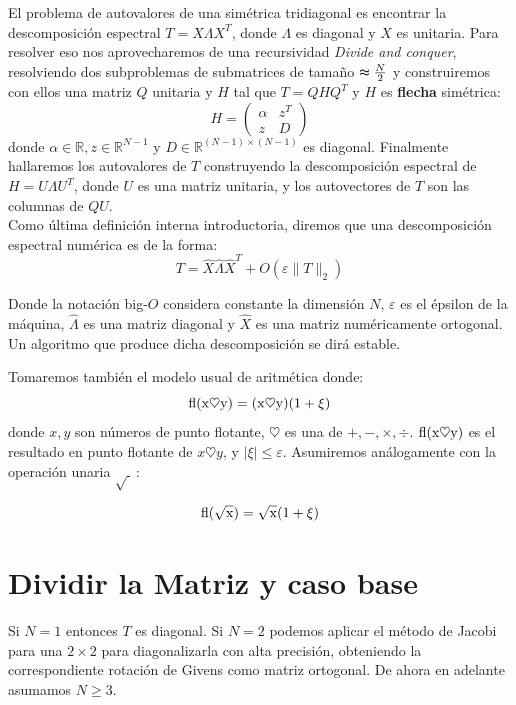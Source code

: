 \documentclass[11pt,a4paper]{article}
\newcommand{\R}{\mathbb{R}}
\begin{document}
El problema de autovalores de una simétrica tridiagonal es encontrar la descomposición espectral $T=X \Lambda X^T$, donde $\Lambda$ es diagonal y $X$ es unitaria. Para resolver eso nos aprovecharemos de una recursividad \textit{Divide and conquer}, resolviendo dos subproblemas de submatrices de tamaño $\thickapprox \frac N2$ y construiremos con ellos una matriz $Q$ unitaria y $H$ tal que $T=QHQ^T$ y $H$ es \textbf{flecha} simétrica:\\
$$H=\begin{pmatrix}
    \alpha & z^T \\
    z & D
\end{pmatrix}$$ 
donde $\alpha \in \R, z\in \R^{N-1}$ y $D \in \R^{(N-1) \times (N-1)}$ es diagonal. Finalmente hallaremos los autovalores de $T$ construyendo la descomposición espectral de $H=U \Lambda U^T$, donde $U$ es una matriz unitaria, y los autovectores de $T$ son las columnas de $QU$. \\

Como última definición interna introductoria, diremos que una descomposición espectral numérica es de la forma:\\

\begin{equation}
    T=\hat{X}\hat{\Lambda}\hat{X}^T+O(\varepsilon \|T\|_2) 
\end{equation}

Donde la notación big-$O$ considera constante la dimensión $N$, $\varepsilon$ es el épsilon de la máquina, $\hat{\Lambda}$ es una matriz diagonal y $\hat{X}$ es una matriz numéricamente ortogonal. Un algoritmo que produce dicha descomposición se dirá estable.

Tomaremos también el modelo usual de aritmética donde:
$$\rm{fl}(x \heartsuit y)= (x \heartsuit y)(1+\xi)$$
donde $x,y$ son números de punto flotante, $\heartsuit$ es una de $+,-,\times,\div$. $\rm{fl}(x \heartsuit y)$ es el resultado en punto flotante de $x \heartsuit y$, y $ \mid \xi \mid \leq \varepsilon$. Asumiremos análogamente con la operación unaria $\surd~~:$

$$\rm{fl}(\sqrt x)=\sqrt x (1+\xi)$$


\section{Dividir la Matriz y caso base}

Si $N=1$ entonces $T$ es diagonal. Si $N=2$ podemos aplicar el método de Jacobi para una $2 \times 2$ para diagonalizarla con alta precisión, obteniendo la correspondiente rotación de Givens como matriz ortogonal. De ahora en adelante asumamos $N\geq 3$.\\
\end{document}
